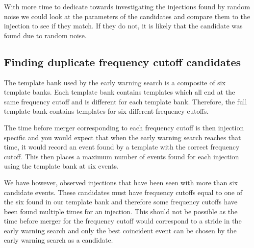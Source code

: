 With more time to dedicate towards investigating the injections found by random noise we could look at the parameters of the candidates and compare them to the injection to see if they match. If they do not, it is likely that the candidate was found due to random noise.

\subsection{\label{6:sec:duplicate-frequency-cands}Finding duplicate frequency cutoff candidates}


The template bank used by the early warning search is a composite of six template banks. Each template bank contains templates which all end at the same frequency cutoff and is different for each template bank. Therefore, the full template bank contains templates for six different frequency cutoffs.

The time before merger corresponding to each frequency cutoff is then injection specific and you would expect that when the early warning search reaches that time, it would record an event found by a template with the correct frequency cutoff. This then places a maximum number of events found for each injection using the template bank at six events.

We have however, observed injections that have been seen with more than six candidate events. These candidates must have frequency cutoffs equal to one of the six found in our template bank and therefore some frequency cutoffs have been found multiple times for an injection. This should not be possible as the time before merger for the frequency cutoff would correspond to a stride in the early warning search and only the best coincident event can be chosen by the early warning search as a candidate.

